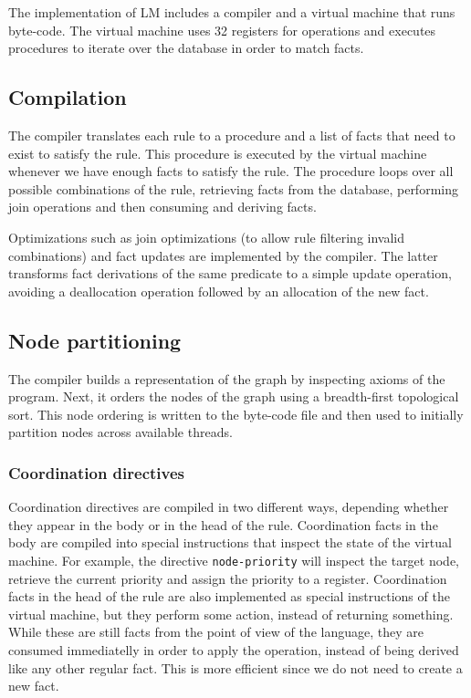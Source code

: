 The implementation of LM includes a compiler and a virtual machine that runs
byte-code. The virtual machine uses 32 registers for
operations and executes procedures to iterate over the database in order to match facts.

\subsection{Compilation}

The compiler translates each rule to a procedure and a list of facts that need
to exist to satisfy the rule. This procedure is executed by the virtual
machine whenever we have enough facts to satisfy the rule. The procedure
loops over all possible combinations of the rule, retrieving facts from the
database, performing join operations and then consuming and deriving facts.

Optimizations such as join optimizations (to allow rule filtering invalid
combinations) and fact updates are implemented by the compiler. The latter
transforms fact derivations of the same predicate to a simple update operation,
avoiding a deallocation operation followed by an allocation of the new fact.

\subsection{Node partitioning}

The compiler builds a representation of the graph by inspecting axioms of the
program. Next, it orders the nodes of the graph using a breadth-first
topological sort. This node ordering is written to the byte-code file and then
used to initially partition nodes across available threads.

\subsubsection{Coordination directives}

Coordination directives are compiled in two different ways, depending whether they
appear in the body or in the head of the rule. Coordination facts in the body
are compiled into special instructions that inspect the state of the virtual
machine. For example, the directive \texttt{node-priority} will inspect the
target node, retrieve the current priority and assign the priority to a
register. Coordination facts in the head of the rule are also implemented as
special instructions of the virtual machine, but they perform some action,
instead of returning something. While these are still facts from the point of
view of the language, they are consumed immediatelly in order to apply the
operation, instead of being derived like any other regular fact. This is more
efficient since we do not need to create a new fact.

